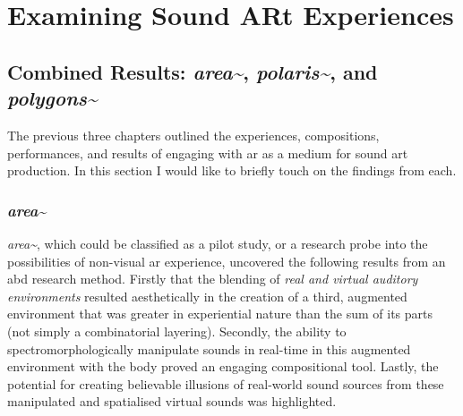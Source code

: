 \section{Examining Sound ARt Experiences}\label{sec: discussion-medium}
\subsection{Combined Results: \textit{area\textasciitilde{}}, \textit{polaris\textasciitilde{}}, and \textit{polygons\textasciitilde{}}}
The previous three chapters outlined the experiences, compositions, performances, and results of engaging with \gls{ar} as a medium for sound \gls{art} production. In this section I would like to briefly touch on the findings from each.

\subsubsection{\textit{area\textasciitilde{}}}
\textit{area\textasciitilde{}}, which could be classified as a pilot study, or a research probe into the possibilities of non-visual \gls{ar} experience, uncovered the following results from an \gls{abd} research method. Firstly that the blending of \textit{real and virtual auditory environments} resulted aesthetically in the creation of a third, augmented environment that was greater in experiential nature than the sum of its parts (not simply a combinatorial layering). Secondly, the ability to spectromorphologically manipulate sounds in real-time in this augmented environment with the body proved an engaging compositional tool. Lastly, the potential for creating believable illusions of real-world sound sources from these manipulated and spatialised virtual sounds was highlighted.

